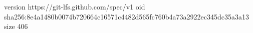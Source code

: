 version https://git-lfs.github.com/spec/v1
oid sha256:8e4a1480b0074b720664c16571c4482d565fc760b4a73a2922ec345dc35a3a13
size 406
